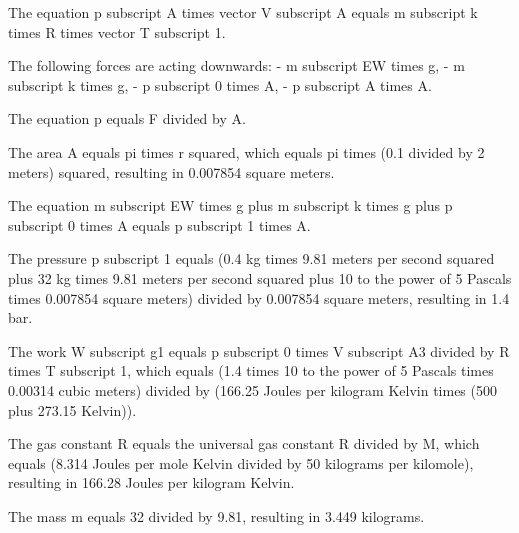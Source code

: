 The equation p subscript A times vector V subscript A equals m subscript k times R times vector T subscript 1.

The following forces are acting downwards:
- m subscript EW times g,
- m subscript k times g,
- p subscript 0 times A,
- p subscript A times A.

The equation p equals F divided by A.

The area A equals pi times r squared, which equals pi times (0.1 divided by 2 meters) squared, resulting in 0.007854 square meters.

The equation m subscript EW times g plus m subscript k times g plus p subscript 0 times A equals p subscript 1 times A.

The pressure p subscript 1 equals (0.4 kg times 9.81 meters per second squared plus 32 kg times 9.81 meters per second squared plus 10 to the power of 5 Pascals times 0.007854 square meters) divided by 0.007854 square meters, resulting in 1.4 bar.

The work W subscript g1 equals p subscript 0 times V subscript A3 divided by R times T subscript 1, which equals (1.4 times 10 to the power of 5 Pascals times 0.00314 cubic meters) divided by (166.25 Joules per kilogram Kelvin times (500 plus 273.15 Kelvin)).

The gas constant R equals the universal gas constant R divided by M, which equals (8.314 Joules per mole Kelvin divided by 50 kilograms per kilomole), resulting in 166.28 Joules per kilogram Kelvin.

The mass m equals 32 divided by 9.81, resulting in 3.449 kilograms.